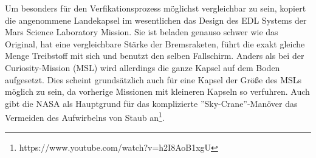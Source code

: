 Um besonders für den Verfikationsprozess möglichst vergleichbar zu sein, kopiert die angenommene Landekapsel im wesentlichen das Design des EDL Systems der Mars Science Laboratory Mission. Sie ist beladen genauso schwer wie das Original, hat eine vergleichbare Stärke der Bremsraketen, führt die exakt gleiche Menge Treibstoff mit sich und benutzt den selben Fallschirm. Anders als bei der Curiosity-Mission (MSL) wird allerdings die ganze Kapsel auf dem Boden aufgesetzt. Dies scheint grundsätzlich auch für eine Kapsel der Größe des MSLs möglich zu sein, da vorherige Missionen mit kleineren Kapseln so verfuhren. Auch gibt die NASA als Hauptgrund für das komplizierte ''Sky-Crane''-Manöver das Vermeiden des Aufwirbelns von Staub an\footnote{https://www.youtube.com/watch?v=h2I8AoB1xgU}.